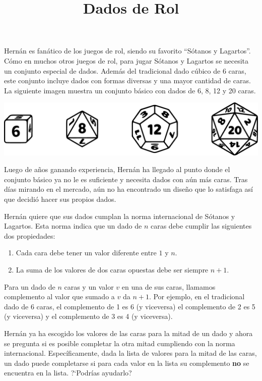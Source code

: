 \documentclass{oci}
\title{Dados de Rol}
\begin{document}
\begin{problemDescription}
  Hernán es fanático de los juegos de rol, siendo su favorito ``Sótanos y Lagartos''.
  Cómo en muchos otros juegos de rol, para jugar Sótanos y Lagartos se
  necesita un conjunto especial de dados.
  Además del tradicional dado cúbico de 6 caras, este conjunto incluye dados
  con formas diversas y una mayor cantidad de caras.
  La siguiente imagen muestra un conjunto básico con
  dados de 6, 8, 12 y 20 caras.
  \begin{center}
    \includegraphics[scale=0.2]{horizontal-sin4}
  \end{center}

  Luego de años ganando experiencia, Hernán ha llegado al
  punto donde el conjunto básico ya no le es suficiente
  y necesita dados con aún más caras.
  Tras días mirando en el mercado, aún no ha encontrado
  un diseño que lo satisfaga así que decidió hacer sus propios
  dados.

  Hernán quiere que sus dados cumplan la norma internacional
  de Sótanos y Lagartos.
  Esta norma indica que un dado de $n$ caras debe cumplir las
  siguientes dos propiedades:
  \begin{enumerate}
    \item Cada cara debe tener un valor diferente entre $1$ y $n$.
    \item La suma de los valores de dos caras opuestas debe ser siempre $n+1$.
  \end{enumerate}
  Para un dado de $n$ caras y un valor $v$ en una de sus caras, llamamos
  complemento al valor que sumado a $v$ da $n+1$.
  Por ejemplo, en el tradicional dado de 6 caras, el complemento de 1 es 6 (y viceversa)
  el complemento de 2 es 5 (y viceversa) y el complemento de 3 es 4 (y viceversa).

  Hernán ya ha escogido los valores de las caras para la mitad de un dado y
  ahora se pregunta si es posible completar la otra mitad cumpliendo con la norma
  internacional.
  Específicamente, dada la lista de valores para la mitad de las caras, un
  dado puede completarse si para cada valor en la lista su complemento \textbf{no} se
  encuentra en la lista.
  ?`Podrías ayudarlo?
\end{problemDescription}
\end{document}
